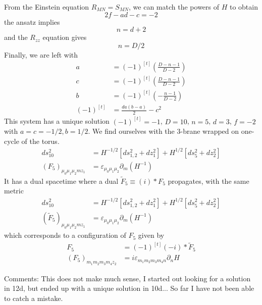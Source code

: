 From the Einstein equation $R_{MN} = S_{MN}$, we can match the powers of $H$ to obtain
\begin{equation}
2f - ad - c = -2
\end{equation}
the ansatz implies
\begin{equation}
n=d+2
\end{equation}
and the $R_{zz}$ equation gives
\begin{equation}
n = D/2
\end{equation}
Finally, we are left with
\begin{align}
a&=(-1)^{[t]}\left(\frac{D-n-1}{D-2}\right)\\
c&=(-1)^{[t]}\left(\frac{D-n-1}{D-2}\right)\\
b&=(-1)^{[t]}\left(-\frac{n-1}{D-2}\right)\\
(-1)^{[t]}&=
\frac{da(b-a)}{2} - c^2
\end{align}
This system has a unique solution $(-1)^{[t]} = -1$, $D=10$, $n=5$, $d=3$, $f=-2$ with $a=c=-1/2, b=1/2$.
We find ourselves with the 3-brane wrapped on one-cycle of the torus.
\begin{align}
ds_{10}^2 &= H^{-1/2}[ds_{1,2}^2 + dz_1^2] + H^{1/2}[ds_5^2 + dz_2^2]\\
(F_5)_{\mu_0 \mu_1 \mu_2 m z_1} &= \varepsilon_{\mu_0 \mu_1 \mu_2}\partial_m (H^{-1})
\end{align}
It has a dual spacetime where a dual $\tilde F_5 \equiv (i) *F_5$ propagates, with the same metric
\begin{align}
ds_{10}^2 &= H^{-1/2}[ds_{1,2}^2 + dz_1^2] + H^{1/2}[ds_5^2 + dz_2^2]\\
(\tilde F_5)_{\mu_0 \mu_1 \mu_2 m z_1} &= \varepsilon_{\mu_0 \mu_1 \mu_2}\partial_m (H^{-1})
\end{align}
which corresponds to a configuration of $F_5$ given by
\begin{align}
F_5 &= (-1)^{[t]}(-i)*\tilde F_5\\
(F_5)_{m_1 m_2 m_3 m_4 z_2}&=i\varepsilon_{m_1m_2m_3 m_4 n} \partial_n H
\end{align}

Comments: This does not make much sense, I started out looking for a solution in 12d, but ended up with a unique solution in 10d... So far I have not been able to catch a mistake. 

